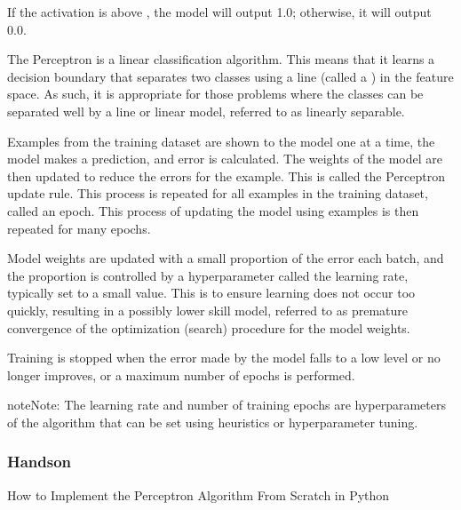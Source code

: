 \documentclass[letterpaper,10pt,english]{sphinxmanual}
\let\sphinxpxdimen\pdfpxdimen\else\newdimen\sphinxpxdimen
\begin{document}
\sphinxAtStartPar
If the activation is above , the model will output 1.0; otherwise, it will output 0.0.

\sphinxAtStartPar
The Perceptron is a linear classification algorithm. This means that it learns a decision boundary that separates two classes using a line (called a )
in the feature space. As such, it is appropriate for those problems where the classes can be separated well by a line or linear model,
referred to as linearly separable.

\sphinxAtStartPar
Examples from the training dataset are shown to the model one at a time, the model makes a prediction, and error is calculated. The weights of the model are then updated to reduce the errors for the example. This is called the Perceptron update rule. This process is repeated for all examples in the training dataset, called an epoch. This process of updating the model using examples is then repeated for many epochs.

\sphinxAtStartPar
Model weights are updated with a small proportion of the error each batch, and the proportion is controlled by a hyperparameter called the learning rate, typically set to a small value. This is to ensure learning does not occur too quickly, resulting in a possibly lower skill model, referred to as premature convergence of the optimization (search) procedure for the model weights.

\sphinxAtStartPar
{}
Training is stopped when the error made by the model falls to a low level or no longer improves, or a maximum number of epochs is performed.

\noindent\sphinxincludegraphics[width=500\sphinxpxdimen]{{Perceptron_alg}.jpg}

\begin{sphinxadmonition}{note}{Note:}
\sphinxAtStartPar
The learning rate and number of training epochs are hyperparameters of the algorithm that can be set using heuristics or hyperparameter tuning.
\end{sphinxadmonition}


\subsubsection{Hands\sphinxhyphen{}on}
\label{\detokenize{percept/basics:hands-on}}
\sphinxAtStartPar
How to Implement the Perceptron Algorithm From Scratch in Python
\end{document}
